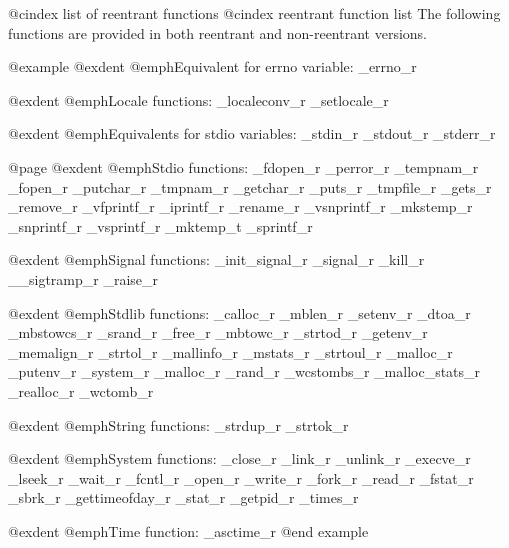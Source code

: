 @cindex list of reentrant functions
@cindex reentrant function list
The following functions are provided in both reentrant
and non-reentrant versions.

@example
@exdent @emph{Equivalent for errno variable:}
_errno_r

@exdent @emph{Locale functions:}
_localeconv_r  _setlocale_r

@exdent @emph{Equivalents for stdio variables:}
_stdin_r        _stdout_r       _stderr_r

@page  
@exdent @emph{Stdio functions:}
_fdopen_r       _perror_r       _tempnam_r
_fopen_r        _putchar_r      _tmpnam_r
_getchar_r      _puts_r         _tmpfile_r
_gets_r         _remove_r       _vfprintf_r
_iprintf_r      _rename_r       _vsnprintf_r
_mkstemp_r      _snprintf_r     _vsprintf_r
_mktemp_t       _sprintf_r

@exdent @emph{Signal functions:}
_init_signal_r  _signal_r
_kill_r         __sigtramp_r
_raise_r

@exdent @emph{Stdlib functions:}
_calloc_r       _mblen_r        _setenv_r
_dtoa_r         _mbstowcs_r     _srand_r
_free_r         _mbtowc_r       _strtod_r
_getenv_r       _memalign_r     _strtol_r
_mallinfo_r     _mstats_r       _strtoul_r
_malloc_r       _putenv_r       _system_r
_malloc_r       _rand_r         _wcstombs_r
_malloc_stats_r _realloc_r      _wctomb_r

@exdent @emph{String functions:}
_strdup_r       _strtok_r

@exdent @emph{System functions:}
_close_r        _link_r         _unlink_r
_execve_r       _lseek_r        _wait_r
_fcntl_r        _open_r         _write_r 
_fork_r         _read_r
_fstat_r        _sbrk_r
_gettimeofday_r _stat_r
_getpid_r       _times_r

@exdent @emph{Time function:}
_asctime_r
@end example
